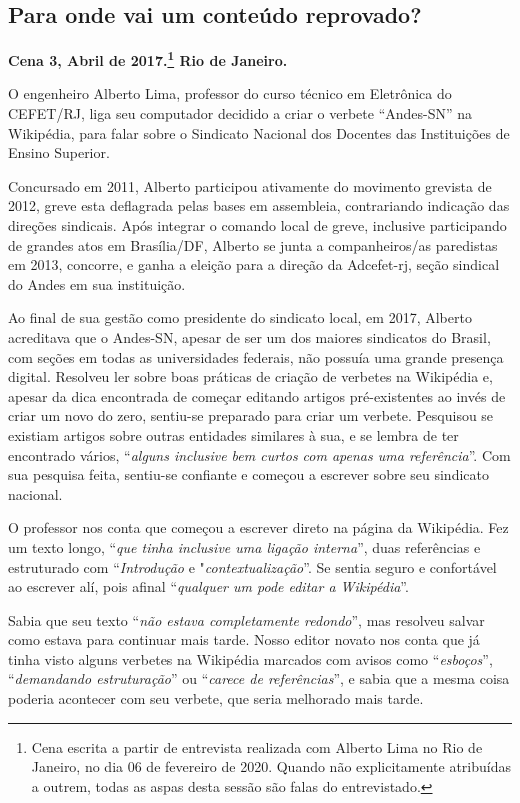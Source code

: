 \subsection{Para onde vai um conteúdo reprovado?}

\textbf{Cena 3, Abril de 2017.\footnote{Cena escrita a partir de entrevista realizada com Alberto Lima no Rio de Janeiro, no dia 06 de fevereiro de 2020. Quando não explicitamente atribuídas a outrem, todas as aspas desta sessão são falas do entrevistado.} Rio de Janeiro.}

O engenheiro Alberto Lima, professor do curso técnico em Eletrônica do CEFET/RJ, liga seu computador decidido a criar o verbete ``Andes-SN'' na Wikipédia, para falar sobre o Sindicato Nacional dos Docentes das Instituições de Ensino Superior.

Concursado em 2011, Alberto participou ativamente do movimento grevista de 2012, greve esta deflagrada pelas bases em assembleia, contrariando indicação das direções sindicais. Após integrar o comando local de greve, inclusive participando de grandes atos em Brasília/DF, Alberto se junta a companheiros/as paredistas em 2013, concorre, e ganha a eleição para a direção da Adcefet-rj, seção sindical do Andes em sua instituição.

Ao final de sua gestão como presidente do sindicato local, em 2017, Alberto acreditava que o Andes-SN, apesar de ser um dos maiores sindicatos do Brasil, com seções em todas as universidades federais, não possuía uma grande presença digital. Resolveu ler sobre boas práticas de criação de verbetes na Wikipédia e, apesar da dica encontrada de começar editando artigos pré-existentes ao invés de criar um novo do zero, sentiu-se preparado para criar um verbete. Pesquisou se existiam artigos sobre outras entidades similares à sua, e se lembra de ter encontrado vários, ``\textit{alguns inclusive bem curtos com apenas uma referência}''. Com sua pesquisa feita, sentiu-se confiante e começou a escrever sobre seu sindicato nacional.

O professor nos conta que começou a escrever direto na página da Wikipédia. Fez um texto longo, ``\textit{que tinha inclusive uma ligação interna}'', duas referências e estruturado com ``\textit{Introdução} e "\textit{contextualização}''. Se sentia seguro e confortável ao escrever alí, pois afinal ``\textit{qualquer um pode editar a Wikipédia}''.
	
Sabia que seu texto ``\textit{não estava completamente redondo}'', mas resolveu salvar como estava para continuar mais tarde. Nosso editor novato nos conta que já tinha visto alguns verbetes na Wikipédia marcados com avisos como ``\textit{esboços}'', ``\textit{demandando estruturação}'' ou ``\textit{carece de referências}'', e sabia que a mesma coisa poderia acontecer com seu verbete, que seria melhorado mais tarde.

